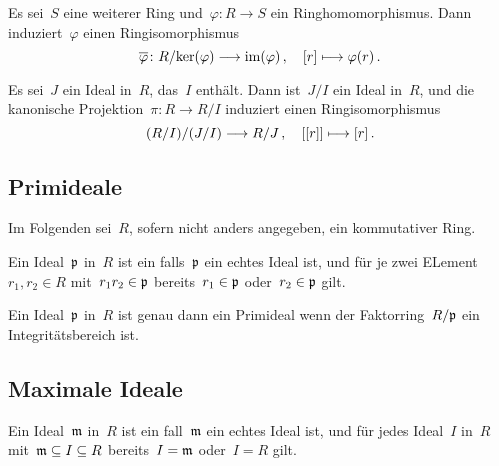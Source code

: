 \begin{corollary}
  Es sei~$S$ eine weiterer Ring und~$\varphi \colon R \to S$ ein Ringhomomorphismus.
  Dann induziert~$\varphi$ einen Ringisomorphismus
  \[
    \induced{\varphi}
    \colon
    R/{\ker(\varphi)} \to \im(\varphi) \,,
    \quad
    \class{r}
    \mapsto
    \varphi(r) \,.
  \]
\end{corollary}


\begin{theorem}
  Es sei~$J$ ein Ideal in~$R$, das~$I$ enthält.
  Dann ist~$J/I$ ein Ideal in~$R$, und die kanonische Projektion~$\pi \colon R \to R/I$ induziert einen Ringisomorphismus
  \[
    (R/I) / (J/I)
    \to
    R/J \,,
    \quad
    \class{ \class{r} }
    \mapsto
    \class{r} \,.
  \]
\end{theorem}



\subsection{Primideale}

\begin{convention}
  Im Folgenden sei~$R$, sofern nicht anders angegeben, ein kommutativer Ring.
\end{convention}

\begin{definition}
  Ein Ideal~$\mathfrak{p}$ in~$R$ ist ein  falls~$\mathfrak{p}$ ein echtes Ideal ist, und für je zwei ELement~$r_1, r_2 \in R$ mit~$r_1 r_2 \in \mathfrak{p}$ bereits~$r_1 \in \mathfrak{p}$ oder~$r_2 \in \mathfrak{p}$ gilt.
\end{definition}

\begin{proposition}
  Ein Ideal~$\mathfrak{p}$ in~$R$ ist genau dann ein Primideal wenn der Faktorring~$R/\mathfrak{p}$ ein Integritätsbereich ist.
\end{proposition}



\subsection{Maximale Ideale}

\begin{definition}
  Ein Ideal~$\mathfrak{m}$ in~$R$ ist ein  fall~$\mathfrak{m}$ ein echtes Ideal ist, und für jedes Ideal~$I$ in~$R$ mit~$\mathfrak{m} \subseteq I \subseteq R$ bereits~$I = \mathfrak{m}$ oder~$I = R$ gilt.
\end{definition}


